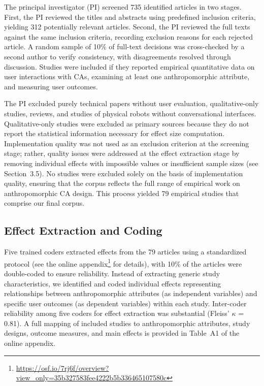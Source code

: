 \documentclass[manuscript,screen,review,anonymous]{acmart}
\DeclareRobustCommand{\change}[1]{%
    \textcolor{changeblue}{#1}%
  }
\DeclareRobustCommand{\change}[1]{#1}
\begin{document}
The principal investigator (PI) screened 735 identified articles in two stages. First, the PI reviewed the titles and abstracts using predefined inclusion criteria, yielding 312 potentially relevant articles. Second, the PI reviewed the full texts against the same inclusion criteria, recording exclusion reasons for each rejected article. A random sample of 10\% of full-text decisions was cross-checked by a second author to verify consistency, with disagreements resolved through discussion. Studies were included if they reported empirical quantitative data on user interactions with CAs, examining at least one anthropomorphic attribute, and measuring user outcomes. 

\change{The PI excluded purely technical papers without user evaluation, qualitative-only studies, reviews, and studies of physical robots without conversational interfaces. Qualitative-only studies were excluded as primary sources because they do not report the statistical information necessary for effect size computation.  Implementation quality was not used as an exclusion criterion at the screening stage; rather, quality issues were addressed at the effect extraction stage by removing individual effects with impossible values or insufficient sample sizes (see Section~3.5). No studies were excluded solely on the basis of implementation quality, ensuring that the corpus reflects the full range of empirical work on anthropomorphic CA design.} This process yielded 79 empirical studies that comprise our final corpus.

\subsection{Effect Extraction and Coding}

Five trained coders extracted effects from the 79 articles using a standardized protocol (see the online appendix\footnote{\href{https://osf.io/7rj6f/overview?view_only=35b327583fee4222b5b336465107580c}{https://osf.io/7rj6f/overview?view\_only=35b327583fee4222b5b336465107580c}} for details), with 10\% of the articles were double-coded to ensure reliability. Instead of extracting generic study characteristics, we identified and coded individual effects representing relationships between anthropomorphic attributes (as independent variables) and specific user outcomes (as dependent variables) within each study. Inter-coder reliability among five coders for effect extraction was substantial (Fleiss' $\kappa$ = 0.81). \change{A full mapping of included studies to anthropomorphic attributes, study designs, outcome measures, and main effects is provided in Table~A1 of the online appendix.}
\end{document}
